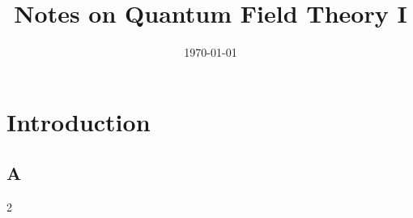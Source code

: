 \documentclass[12pt,aps,
		prd,
        superscriptaddress,
        shortbibliography,
		  nofootinbib,
		floatfix,
		notitlepage, onecolumn
		]{report}
\begin{document}
\newpage
\title{\Huge\textbf{Notes on Quantum Field Theory I}}
\date{\today}
\maketitle
\newpage
\chapter{Introduction}
\section{A}
\begin{multicols}{2}

\end{multicols}
\end{document}
